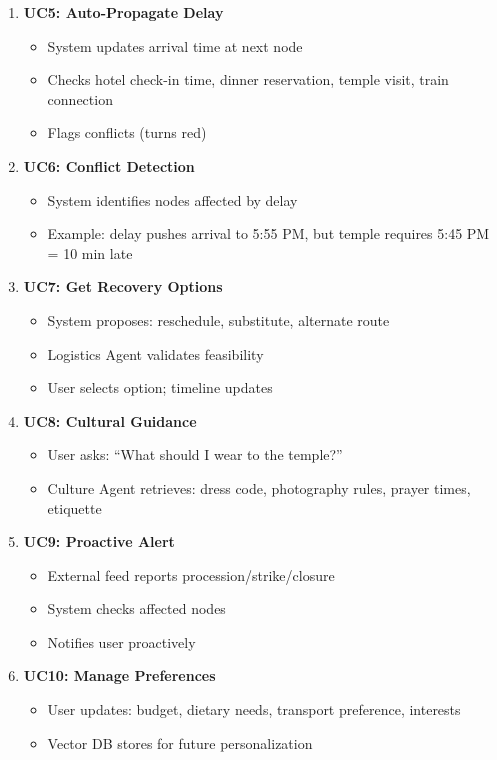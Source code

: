 \documentclass[11pt]{article}
\begin{document}
\begin{enumerate}
    \item \textbf{UC5: Auto-Propagate Delay}
    \begin{itemize}
        \item System updates arrival time at next node
        \item Checks hotel check-in time, dinner reservation, temple visit, train connection
        \item Flags conflicts (turns red)
    \end{itemize}

    \item \textbf{UC6: Conflict Detection}
    \begin{itemize}
        \item System identifies nodes affected by delay
        \item Example: delay pushes arrival to 5:55 PM, but temple requires 5:45 PM = 10 min late
    \end{itemize}

    \item \textbf{UC7: Get Recovery Options}
    \begin{itemize}
        \item System proposes: reschedule, substitute, alternate route
        \item Logistics Agent validates feasibility
        \item User selects option; timeline updates
    \end{itemize}

    \item \textbf{UC8: Cultural Guidance}
    \begin{itemize}
        \item User asks: ``What should I wear to the temple?''
        \item Culture Agent retrieves: dress code, photography rules, prayer times, etiquette
    \end{itemize}

    \item \textbf{UC9: Proactive Alert}
    \begin{itemize}
        \item External feed reports procession/strike/closure
        \item System checks affected nodes
        \item Notifies user proactively
    \end{itemize}

    \item \textbf{UC10: Manage Preferences}
    \begin{itemize}
        \item User updates: budget, dietary needs, transport preference, interests
        \item Vector DB stores for future personalization
    \end{itemize}
\end{enumerate}
\end{document}
